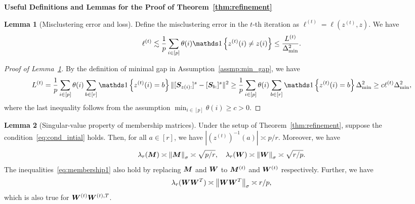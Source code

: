 \documentclass[lettersize,onecolumn,journal]{IEEEtran}
\theoremstyle{definition}
\newtheorem{lem}{Lemma}
\theoremstyle{definition}
\newcommand{\of}[1]{\left(#1\right)}
\newcommand{\offf}[1]{\left\{#1\right\}}
\begin{document}
{\bf Useful Definitions and Lemmas for the Proof of Theorem~\ref{thm:refinement}} 


\begin{lem}[Misclustering error and loss]\label{lem:mis} Define the misclustering error in the $t$-th iteration as $\ell^{(t)} = \ell(z^{(t)}, z)$. We have 
\begin{equation}
    \ell^{(t)} \lesssim \frac{1}{p}\sum_{i \in [p]} \theta(i) \ind\offf{ z^{(t)}(i) \neq z(i) } \leq \frac{L^{(t)}}{\Delta_{\min}^2}.
\end{equation}
\end{lem}

\begin{proof}[Proof of Lemma~\ref{lem:mis}]
By the definition of minimal gap in Assumption~\ref{assmp:min_gap}, we have 
\begin{equation}
         L^{(t)} = \frac{1}{p}  \sum_{i \in [p]} \theta(i) \sum_{b \in [r]}  \ind \offf{ z^{(t)}(i) = b } \onormSize{}{ [ \mS_{ z(i):}  ]^s - [ \mS_{b:}  ]^s  }^2 \geq \frac{1}{p}  \sum_{i \in [p]} \theta(i) \sum_{b \in [r]}  \ind \offf{ z^{(t)}(i) = b } \Delta_{\min}^2 \geq c \ell^{(t)} \Delta_{\min}^2,
    \end{equation}
    where the last inequality follows from the assumption $\min_{i \in [p]} \theta(i) \geq c>0$.
\end{proof}

\begin{lem}[Singular-value property of membership matrices]\label{lem:membership} Under the setup of Theorem~\ref{thm:refinement}, suppose the condition~\eqref{eq:cond_intial} holds. Then, for all $a \in [r]$, we have $|\of{z^{(t)}}^{-1}(a)| \asymp p/r$. Moreover, we have 
\begin{equation}\label{eq:membership1}
    \lambda_{r}(\mM) \asymp \onorm{\mM}_{\sigma} \asymp \sqrt{p/r}, \quad  \lambda_{r}(\mW) \asymp \onorm{\mW}_{\sigma} \asymp \sqrt{r/p}.
\end{equation}
The inequalities~\eqref{eq:membership1} also hold by replacing $\bm M$ and $\bm{W}$ to $\bm M^{(t)}$ and $\bm{W}^{(t)}$ respectively. 
Further, we have 
\begin{equation}\label{eq:WWsingular}
   \lambda_{r}(\mW\mW^T) \asymp \onorm{\mW\mW^T}_{\sigma} \asymp r/p,
\end{equation}
which is also true for $\bm{W}^{(t)}\bm{W}^{(t),T}$.
\end{lem}
\end{document}
